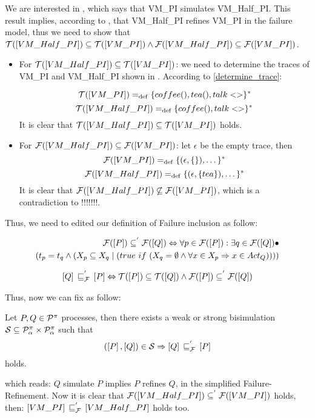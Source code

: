 We are interested in , which says that VM\_PI simulates VM\_Half\_PI. This result implies, according to , that VM\_Half\_PI refines VM\_PI in the failure model, thus we need to show that $\traces[VM\_Half\_PI]\subseteq\traces[VM\_PI] \wedge \failures[VM\_Half\_PI]\subseteq\failures[VM\_PI]$.
\begin{itemize}
\item For $\traces[VM\_Half\_PI]\subseteq\traces[VM\_PI]$: we need to determine the traces of VM\_PI and VM\_Half\_PI  shown in . According to \ref{determine_trace}:

    \[\traces[VM\_PI] \define \{coffee(),tea(),talk<>\}^\ast\]
    \[\traces[VM\_Half\_PI] \define \{coffee(),talk<>\}^\ast\]
It is clear that $\traces[VM\_Half\_PI]\subseteq\traces[VM\_PI]$ holds. 

\item For $\failures[VM\_Half\_PI]\subseteq\failures[VM\_PI]$: let $\epsilon$ be the empty trace, then
    \[\failures[VM\_PI] \define \{(\epsilon,\{\}),\dots\}^\ast\]
    \[\failures[VM\_Half\_PI] \define \{(\epsilon,\{tea\}),\dots\}^\ast\]
It is clear that $\failures[VM\_Half\_PI]\not\subseteq\failures[VM\_PI]$, which is a contradiction to  !!!!!!!. 
\end{itemize}

    Thus, we need to edited our definition of Failure inclusion  as follow: 

\begin{align}
   \failures[P]\subseteq^{'}\failures[Q] \Leftrightarrow \forall p \in \failures[P] : \exists q \in \failures[Q] \bullet\\ (t_p = t_q \wedge (X_p \subseteq X_q \mid (true \  if \ (X_q = \emptyset\wedge \forall x\in X_p \Rightarrow x\in Act_Q ))))
\end{align}
   



\begin{align}
   \ec{Q} \refiFSimp \ec{P} \Leftrightarrow  \traces[P]\subseteq\traces[Q] \wedge \failures[P]\subseteq^{'}\failures[Q]
\end{align}

 Thus, now we can fix  as follow:

\begin{cor}
\label{cor_sim_simp_failure_refinement}
Let $P,Q\in\mathcal P^{\pi}$ processes, then there exists a weak or strong bisimulation $\mathcal{S}\subseteq\mathcal P^{\pi}_\alpha\times\mathcal P^{\pi}_\alpha$ such that
\begin{align}
(\ec{P},\ec{Q})\in{}\simu  \Rightarrow \ec{Q} \refiFSimp \ec{P}
   \label{simp_failure_ref}
\end{align}
holds.
\end{cor}%
which reads:  $Q$ simulate $P$ implies $P$ refines $Q$, in the simplified Failure-Refinement. Now it is clear that $\failures[VM\_Half\_PI]\subseteq^{'}\failures[VM\_PI]$ holds, then: $\ec{VM\_PI} \refiFSimp \ec{VM\_Half\_PI}$ holds too.


